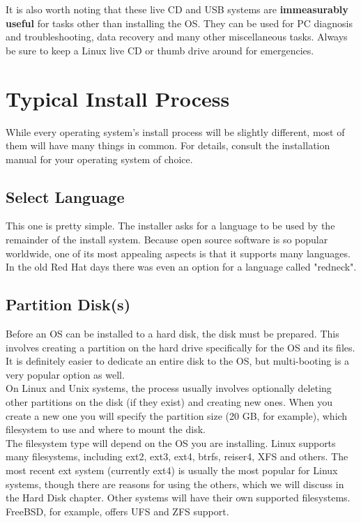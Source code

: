 It is also worth noting that these live CD and USB systems are \textbf{immeasurably useful} for tasks other than installing the OS.  They can be used for PC diagnosis and troubleshooting, data recovery and many other miscellaneous tasks.  Always be sure to keep a Linux live CD or thumb drive around for emergencies.

\section{Typical Install Process}

While every operating system's install process will be slightly different, most of them will have many things in common.  For details, consult the installation manual for your operating system of choice.

\subsection{Select Language}

This one is pretty simple.  The installer asks for a language to be used by the remainder of the install system.  Because open source software is so popular worldwide, one of its most appealing aspects is that it supports many languages.  In the old Red Hat days there was even an option for a language called "redneck".

\subsection{Partition Disk(s)}

Before an OS can be installed to a hard disk, the disk must be prepared.  This involves creating a partition on the hard drive specifically for the OS and its files.  It is definitely easier to dedicate an entire disk to the OS, but multi-booting is a very popular option as well.\\

On Linux and Unix systems, the process usually involves optionally deleting other partitions on the disk (if they exist) and creating new ones.  When you create a new one you will specify the partition size (20 GB, for example), which filesystem to use and where to mount the disk.\\

The filesystem type will depend on the OS you are installing.  Linux supports many filesystems, including ext2, ext3, ext4, btrfs, reiser4, XFS and others.  The most recent ext system (currently ext4) is usually the most popular for Linux systems, though there are reasons for using the others, which we will discuss in the Hard Disk chapter.  Other systems will have their own supported filesystems.  FreeBSD, for example, offers UFS and ZFS support.\\

